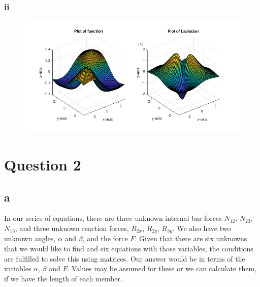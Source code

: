 \documentclass[11pt]{article}
\numberwithin{equation}{section}
\begin{document}
\subsubsection{ii}
\begin{figure}[H]
    \centering
    \includegraphics[width = \textwidth]{./img/q1hii.png}
    \caption{}
\end{figure}

\section{Question 2}
\subsection{a}
In our series of equations, there are three unknown internal bar forces $N_{12}$, $N_{23}$, $N_{13}$, and three unknown reaction forces, $R_{2x}$, $R_{2y}$, $R_{3y}$. We also have two unknown angles, $\alpha$ and $\beta$, and the force $F$. Given that there are six unknowns that we would like to find and six equations with those variables, the conditions are fulfilled to solve this using matrices. Our answer would be in terms of the variables $\alpha$, $\beta$ and $F$. Values may be assumed for these or we can calculate them, if we have the length of each member.
\end{document}
